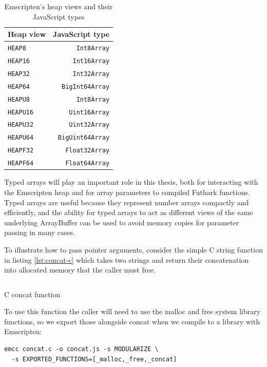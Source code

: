 \documentclass[11pt]{book}
\newcommand{\textBf}[1]{\textbf{#1}}
\begin{document}
\begin{table}[H]
\centering
\begin{tabular}{|l|r|}
\hline
\textBf{Heap view} & \textBf{JavaScript type} \\ \hline
\texttt{HEAP8} & \texttt{Int8Array} \\ \hline
\texttt{HEAP16} & \texttt{Int16Array} \\ \hline
\texttt{HEAP32} & \texttt{Int32Array} \\ \hline
\texttt{HEAP64} & \texttt{BigInt64Array} \\ \hline
\texttt{HEAPU8} & \texttt{Int8Array} \\ \hline
\texttt{HEAPU16} & \texttt{Uint16Array} \\ \hline
\texttt{HEAPU32} & \texttt{Uint32Array} \\ \hline
\texttt{HEAPU64} & \texttt{BigUint64Array} \\ \hline
\texttt{HEAPF32} & \texttt{Float32Array} \\ \hline
\texttt{HEAPF64} & \texttt{Float64Array} \\ \hline
\end{tabular}
\caption{Emscripten's heap views and their JavaScript types}
\label{table:heapviews}
\end{table}

Typed arrays will play an important role in this thesis, both for interacting with the Emscripten heap and for array parameters to compiled Futhark functions. Typed arrays are useful because they represent number arrays compactly and efficiently, and the ability for typed arrays to act as different views of the same underlying ArrayBuffer can be used to avoid memory copies for parameter passing in many cases.

To illustrate how to pass pointer arguments, consider the simple C string function in listing \ref{lst:concat-c} which takes two strings and return their concatenation into allocated memory that the caller must free.

\begin{listing}[h!] 
\inputminted[fontsize=\small,baselinestretch=0.5,linenos]{C}{code/examples/emcc/concat.c}
\caption{C concat function }
\label{lst:concat-c}    
\end{listing} 

To use this function the caller will need to use the malloc and free system library functions, so we export those alongside concat when we compile to a library with Emscripten:
\begin{verbatim}
emcc concat.c -o concat.js -s MODULARIZE \
  -s EXPORTED_FUNCTIONS=[_malloc,_free,_concat]
\end{verbatim}
\end{document}
